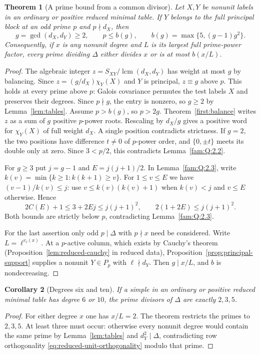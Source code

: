 \documentclass[11pt,a4paper]{article}
\numberwithin{equation}{section}
\newtheorem{theorem}{Theorem}[section]
\newtheorem{corollary}[theorem]{Corollary}
\theoremstyle{remark}
\newcommand{\lcm}{\operatorname{lcm}}
\begin{document}
\begin{theorem}[A prime bound from a common divisor]\label{lem:principal-crossing-prime-bound}
Let $X,Y$ be nonunit labels in an ordinary or positive reduced minimal table. If $Y$ belongs to the full principal block at an odd prime $p$ and $p\nmid d_X$, then
\[
 g=\gcd(d_X,d_Y)\ge2,\qquad p\le b(g),\qquad b(g)=\max\{5,(g-1)g^2\}.
\]
Consequently, if $x$ is any nonunit degree and $L$ is its largest full prime-power factor, every prime dividing $\Delta$ either divides $x$ or is at most $b(x/L)$.
\end{theorem}
\begin{proof}
The algebraic integer $z=S_{XY}/\lcm(d_X,d_Y)$ has weight at most $g$ by balancing. Since $z=(g/d_X)\chi_Y(X)$ and $Y$ is principal, $z\equiv g$ above $p$. This holds at every prime above $p$: Galois covariance permutes the test labels $X$ and preserves their degrees. Since $p\nmid g$, the entry is nonzero, so $g\ge2$ by Lemma~\ref{lem:tables}. Assume $p>b(g)$, so $p>2g$. Theorem~\ref{first:balance} writes $z$ as a sum of $g$ positive $p$-power roots. Rescaling by $d_X/g$ gives a positive word for $\chi_Y(X)$ of full weight $d_X$. A single position contradicts strictness. If $g=2$, the two positions have difference $t\ne0$ of $p$-power order, and $\{0,\pm t\}$ meets its double only at zero. Since $3<p/2$, this contradicts Lemma~\ref{fam:Q:2.2}.

For $g\ge3$ put $j=g-1$ and $E=j(j+1)/2$. In Lemma~\ref{fam:Q:2.3}, write $k(v)=\min\{k\ge1:k(k+1)\ge v\}$. For $1\le v\le E$ we have $(v-1)/k(v)\le j$: use $v\le k(v)(k(v)+1)$ when $k(v)<j$ and $v\le E$ otherwise. Hence
\[
 2C(E)+1\le3+2Ej\le j(j+1)^2,\qquad
 2(1+2E)\le j(j+1)^2.
\]
Both bounds are strictly below $p$, contradicting Lemma~\ref{fam:Q:2.3}.

For the last assertion only odd $p\mid\Delta$ with $p\nmid x$ need be considered. Write $L=\ell^{v_\ell(x)}$. At a $p$-active column, which exists by Cauchy's theorem (Proposition~\ref{lem:reduced-cauchy} in reduced data), Proposition~\ref{prop:principal-support} supplies a nonunit $Y\in P_p$ with $\ell\nmid d_Y$. Then $g\mid x/L$, and $b$ is nondecreasing.
\end{proof}

\begin{corollary}[Degrees six and ten]\label{fam:M:4.16}\label{lem:sixseven}
If a simple in an ordinary or positive reduced minimal table has degree $6$ or $10$, the prime divisors of $\Delta$ are exactly $2,3,5$.
\end{corollary}
\begin{proof}
For either degree $x$ one has $x/L=2$. The theorem restricts the primes to $2,3,5$. At least three must occur: otherwise every nonunit degree would contain the same prime by Lemma~\ref{lem:tables} and $d_Y^2\mid\Delta$, contradicting row orthogonality \eqref{eq:reduced-unit-orthogonality} modulo that prime.
\end{proof}
\end{document}
